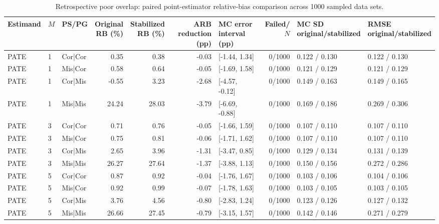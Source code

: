 \begin{table}
\centering\footnotesize
\caption{Retrospective poor overlap: paired point-estimator relative-bias comparison across 1000 sampled data sets.}
\setlength{\tabcolsep}{3pt}
\renewcommand{\arraystretch}{1.12}
\begin{tabular}{lllr r r l r l l}
\toprule
Estimand & $M$ & PS/PG & \shortstack{Original\\RB (\%)} & \shortstack{Stabilized\\RB (\%)} & \shortstack{ARB reduction\\(pp)} & \shortstack{MC error interval\\(pp)} & Failed/$N$ & \shortstack{MC SD\\original/stabilized} & \shortstack{RMSE\\original/stabilized} \\
\midrule
PATE & 1 & Cor|Cor & 0.35 & 0.38 & -0.03 & [-1.44, 1.34] & 0/1000 & 0.122 / 0.130 & 0.122 / 0.130 \\
PATE & 1 & Mis|Cor & 0.58 & 0.64 & -0.05 & [-1.69, 1.58] & 0/1000 & 0.121 / 0.129 & 0.121 / 0.129 \\
PATE & 1 & Cor|Mis & -0.55 & 3.23 & -2.68 & [-4.57, -0.12] & 0/1000 & 0.149 / 0.163 & 0.149 / 0.165 \\
PATE & 1 & Mis|Mis & 24.24 & 28.03 & -3.79 & [-6.69, -0.88] & 0/1000 & 0.169 / 0.186 & 0.269 / 0.306 \\
PATE & 3 & Cor|Cor & 0.71 & 0.76 & -0.05 & [-1.66, 1.59] & 0/1000 & 0.107 / 0.110 & 0.107 / 0.110 \\
PATE & 3 & Mis|Cor & 0.75 & 0.81 & -0.06 & [-1.71, 1.62] & 0/1000 & 0.107 / 0.110 & 0.107 / 0.110 \\
PATE & 3 & Cor|Mis & 2.65 & 3.96 & -1.31 & [-3.47, 0.85] & 0/1000 & 0.129 / 0.134 & 0.131 / 0.139 \\
PATE & 3 & Mis|Mis & 26.27 & 27.64 & -1.37 & [-3.88, 1.13] & 0/1000 & 0.150 / 0.156 & 0.272 / 0.286 \\
PATE & 5 & Cor|Cor & 0.87 & 0.92 & -0.04 & [-1.76, 1.67] & 0/1000 & 0.103 / 0.106 & 0.104 / 0.106 \\
PATE & 5 & Mis|Cor & 0.92 & 0.99 & -0.07 & [-1.78, 1.63] & 0/1000 & 0.103 / 0.105 & 0.103 / 0.105 \\
PATE & 5 & Cor|Mis & 3.76 & 4.56 & -0.80 & [-2.83, 1.24] & 0/1000 & 0.123 / 0.126 & 0.127 / 0.132 \\
PATE & 5 & Mis|Mis & 26.66 & 27.45 & -0.79 & [-3.15, 1.57] & 0/1000 & 0.142 / 0.146 & 0.271 / 0.279 \\

\end{tabular}
\end{table}

